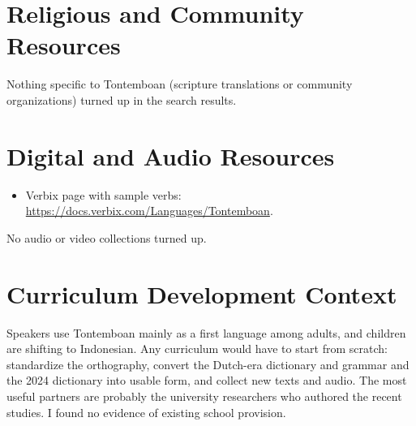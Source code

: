 \documentclass[12pt]{article}
\begin{document}
\section{Religious and Community Resources}
Nothing specific to Tontemboan (scripture translations or community organizations) turned up in the search results.

\section{Digital and Audio Resources}
\begin{itemize}
\item Verbix page with sample verbs: \url{https://docs.verbix.com/Languages/Tontemboan}.
\end{itemize}
No audio or video collections turned up.

\section{Curriculum Development Context}
Speakers use Tontemboan mainly as a first language among adults, and children are shifting to Indonesian. Any curriculum would have to start from scratch: standardize the orthography, convert the Dutch-era dictionary and grammar and the 2024 dictionary into usable form, and collect new texts and audio. The most useful partners are probably the university researchers who authored the recent studies. I found no evidence of existing school provision.
\end{document}
